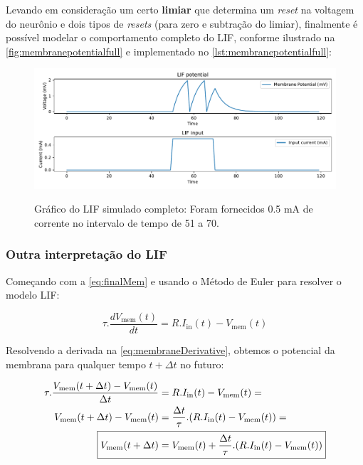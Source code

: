 			\par Levando em consideração um certo \textbf{limiar} que determina um \textit{reset} na voltagem do neurônio e dois tipos de \textit{resets} (para zero e subtração do limiar), finalmente é possível modelar o comportamento completo do LIF, conforme ilustrado na  \autoref{fig:membranepotentialfull} e implementado no \autoref{lst:membranepotentialfull}:
			
			
			
			\begin{figure}[H]
				\centering
				\caption[Gráfico do LIF]{Gráfico do LIF simulado completo: Foram fornecidos 0.5 mA de corrente no intervalo de tempo de 51 a 70.}
				\includegraphics[width=.8\linewidth]{images/membranePotentialFull}
				\label{fig:membranepotentialfull}
			\end{figure}

			
		\subsubsection{Outra interpretação do LIF}
			
			\par Começando com a \autoref{eq:finalMem} e usando o Método de Euler para resolver o modelo LIF:
			
			\begin{equation}
				\tau.\dfrac{dV_{\text{mem}}(t)}{dt} = R.I_{\text{in}}(t) - V_{\text{mem}}(t)
			\end{equation}
			
			\par Resolvendo a derivada na \autoref{eq:membraneDerivative}, obtemos o potencial da membrana para qualquer tempo $t+\Delta t$ no futuro:
			
			\begin{equation}
				\label{eq:membraneDerivative}
				\begin{aligned}
					\tau.\dfrac{V_{\text{mem}}(t+\Delta t) - V_{\text{mem}}(t)}{\Delta t} &= R.I_{\text{in}}(t) - V_{\text{mem}}(t) = \\
					V_{\text{mem}}(t+\Delta t) - V_{\text{mem}}(t) &= \frac{\Delta t}{\tau} . (R.I_{\text{in}}(t) - V_{\text{mem}}(t)) = \\
					\Aboxed{V_{\text{mem}}(t+\Delta t) &= V_{\text{mem}}(t) + \frac{\Delta t}{\tau} . (R.I_{\text{in}}(t) - V_{\text{mem}}(t))}
				\end{aligned}
			\end{equation}

